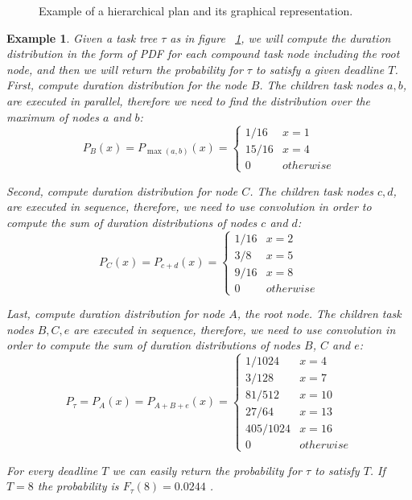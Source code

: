 \documentclass{article}
\newtheorem{example}{Example}
\begin{document}
\begin{figure}
	\centering
	\caption{Example of a hierarchical plan and its graphical representation.}
	\label{fig:hierarchical plan}
\end{figure}


\begin{example}

Given a task tree $\tau$ as in figure ~\ref{fig:hierarchical plan}, we will compute the duration distribution in the form of PDF for each compound task node including the root node, and then we will return the probability for $\tau$ to satisfy a given deadline $T$. 
First, compute duration distribution for the node $B$. The children task nodes $a,b$, are executed in parallel, therefore we need to find the distribution over the maximum of nodes $a$ and $b$:  
$$P_B(x)=P_{\max(a,b)}(x)=
\begin{cases}
1/16 & x=1 \\
15/16 & x=4 \\
0 & otherwise
\end{cases}$$

Second, compute duration distribution for node $C$. The children task nodes $c,d$, are executed in sequence, therefore, we need to use convolution in order to compute the sum of duration distributions of nodes $c$ and $d$:  
$$P_C(x)=P_{c+d}(x)=
\begin{cases}
1/16 & x=2 \\
3/8 & x=5 \\
9/16 & x=8 \\
0 & otherwise
\end{cases}$$

Last, compute duration distribution for node $A$, the root node. The children task nodes $B,C,e$ are executed in sequence, therefore, we need to use convolution in order to compute the sum of duration distributions of nodes $B$, $C$ and $e$: 
$$P_{\tau}=P_A(x)=P_{A+B+e}(x)=
\begin{cases}
1/1024 & x=4 \\
3/128 & x=7 \\
81/512 & x=10 \\
27/64 & x=13 \\
405/1024 & x=16 \\
0 & otherwise
\end{cases}$$

For every deadline $T$ we can easily return the probability for $\tau$ to satisfy $T$. If $T=8$ the probability is  $F_{\tau}(8)=0.0244$ . 
\end{example}
\end{document}
